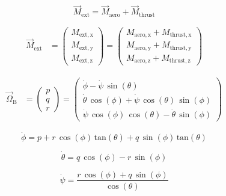 \documentclass{article}
\begin{document}
\begin{dmath}
\overrightarrow{M}_{\mathrm{ext}}=\overrightarrow{M}_{\mathrm{aero}}+\overrightarrow{M}_{\mathrm{thrust}}
\end{dmath}

\begin{dmath}
\begin{aligned}
\overrightarrow{M}_{\mathrm{ext}}&=\left(\begin{array}{c} M_{\mathrm{ext,x}}\\ M_{\mathrm{ext,y}}\\ M_{\mathrm{ext,z}} \end{array}\right)=\left(\begin{array}{c} M_{\mathrm{aero,x}}+M_{\mathrm{thrust,x}}\\ M_{\mathrm{aero,y}}+M_{\mathrm{thrust,y}}\\ M_{\mathrm{aero,z}}+M_{\mathrm{thrust,z}} \end{array}\right)
\end{aligned}
\end{dmath}

\begin{dmath}
\begin{aligned}
\overrightarrow{\Omega}_{\mathrm{B}}&=\left(\begin{array}{c} p\\ q\\ r \end{array}\right)=\left(\begin{array}{c} \dot{\phi }-\dot{\psi }\,\sin\left(\theta \right)\\ \dot{\theta }\,\cos\left(\phi \right)+\dot{\psi }\,\cos\left(\theta \right)\,\sin\left(\phi \right)\\ \dot{\psi }\,\cos\left(\phi \right)\,\cos\left(\theta \right)-\dot{\theta }\,\sin\left(\phi \right) \end{array}\right)
\end{aligned}
\end{dmath}

\begin{dmath}
\dot{\phi }=p+r\,\cos\left(\phi \right)\,\mathrm{tan}\left(\theta \right)+q\,\sin\left(\phi \right)\,\mathrm{tan}\left(\theta \right)
\end{dmath}

\begin{dmath}
\dot{\theta }=q\,\cos\left(\phi \right)-r\,\sin\left(\phi \right)
\end{dmath}

\begin{dmath}
\dot{\psi }=\frac{r\,\cos\left(\phi \right)+q\,\sin\left(\phi \right)}{\cos\left(\theta \right)}
\end{dmath}
\end{document}
